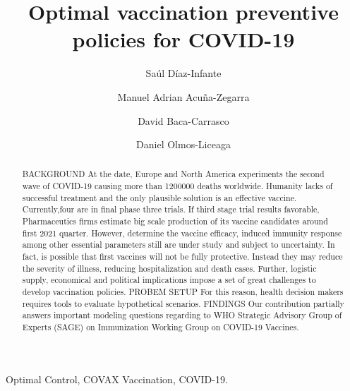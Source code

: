 \documentclass[3p, sort&compress]{elsarticle}
\begin{document}
    \begin{frontmatter}
        \title{
            Optimal vaccination preventive policies for COVID-19\\
        }
        \author[add:conacyt_unison]{%
            Sa\'ul D\'iaz-Infante%
        }%
        \address[add:conacyt_unison]{
            CONACYT-Universidad de Sonora, Departamento de Matem\'aticas,
            Blvd. Luis Encinas y Rosales S/N,
            Hermosillo, Sonora, M\'exico, C.P. 83000.
        }
        \author[add:unison]%
        {Manuel Adrian Acu\~na-Zegarra}
        \address[add:unison]{
            Departamento de Matem\'aticas, Universidad de Sonora,
            Blvd. Luis Encinas y Rosales S/N,
            Hermosillo, Sonora, M\'exico, C.P. 83000.
        }
        \author[add:itson]%
            {David Baca-Carrasco}
        \address[add:itson]{
                Departamento de Matem\'aticas, Instituto Tecnol\'ogico de
                Sonora, 5 de Febrero 818 Sur, Colonia Centro, Ciudad
                Obregón,
                Sonora, M\'exico, C.P. 85000.
        }
        \author[add:unison]%
        {Daniel Olmos-Liceaga}
    \begin{keyword}
        Optimal Control, COVAX
        Vaccination, COVID-19.
    \end{keyword}
    \begin{abstract}
        BACKGROUND
        At the date, Europe and North America experiments the second wave of
        COVID-19 causing more than \num{1200000} deaths worldwide.
        Humanity lacks of successful treatment and the only plausible solution
        is an effective vaccine. Currently,four are in final phase three trials.
        If third stage trial results favorable, Pharmaceutics firms
        estimate big scale production of its vaccine candidates around
        first 2021  quarter.
        However, determine the vaccine efficacy, induced immunity response
        among other essential parameters still are under study and subject to
        uncertainty. In fact, is possible that
        first  vaccines will not be fully protective.
        Instead they may reduce the severity of illness, reducing
        hospitalization and death cases.
        Further, logistic supply, economical and political implications
        impose a set of great challenges to develop vaccination policies.
        PROBEM SETUP
        For this reason, health decision makers requires tools to evaluate
        hypothetical scenarios.
        FINDINGS
        Our contribution partially answers
        important modeling questions regarding to WHO Strategic
        Advisory Group of Experts (SAGE) on
        Immunization Working Group on COVID-19 Vaccines.


\end{abstract}
\end{frontmatter}
\end{document}
